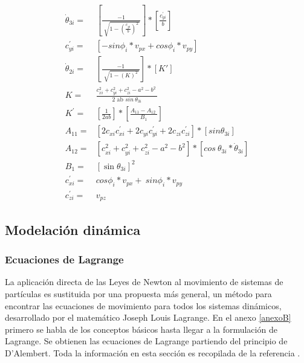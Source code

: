 \newpage

    \begin{align}
        \dot{ \theta }_{3i}={}& \left[ \frac{-1}{\sqrt[]{1- \left( \frac{c_{yi}}{b} \right) ^{2}~}} \right] \ast \left[ \frac{c_{yi}^{'}}{b} \right]
        \label{eq:cap4_eq_44}\\
        c_{yi}^{'}={}& \left[ -sin \phi _{i}\ast v_{px} + cos \phi _{i}\ast v_{py} \right]
        \label{eq:cap4_eq_45}\\
       \dot{ \theta }_{2i}={}& \left[ \frac{-1}{\sqrt[]{1- \left(  K \right) ^{2}~}} \right] \ast \left[ K' \right]
        \label{eq:cap4_eq_46}\\
        K={}& \frac{c_{xi}^{2}+c_{yi}^{2}+c_{zi}^{2}- a^{2}-b^{2}~}{\text{2 ab }sin~ \theta _{3i}}
        \label{eq:cap4_eq_47}\\
       K^{'}={}& \left[ \frac{1}{2ab} \right] \ast \left[ \frac{A_{11}-A_{12}~}{B_{1}} \right]
        \label{eq:cap4_eq_48}\\
        A_{11}={}& \left[ 2c_{xi}c_{xi}^{'}+2c_{yi}c_{yi}^{'}+2c_{zi}c_{zi}^{'} \right] \ast \left[ sin  \theta _{3i} \right]
        \label{eq:cap4_eq_49}\\
        A_{12}={}& \left[ c_{xi}^{2}+c_{yi}^{2}+c_{zi}^{2}- a^{2}-b^{2} \right] \ast \left[ cos~ \theta _{3i}\ast\dot{ \theta }_{3i} \right]
        \label{eq:cap4_eq_50}\\
        B_{1}={}& \left[ \sin  \theta _{3i} \right] ^{2}
        \label{eq:cap4_eq_51}\\
       c_{xi}^{'}={}& cos \phi _{i}\ast v_{px}+~ sin \phi _{i}\ast v_{py}
        \label{eq:cap4_eq_52}\\
       c_{zi}^{'}={}& v_{pz}
        \label{eq:cap4_eq_53}
    \end{align}


         \newpage






    \newpage

    
    \subsection{Modelación dinámica}
        \subsubsection{Ecuaciones de Lagrange}
            La aplicación directa de las Leyes de Newton al movimiento de sistemas de partículas es sustituida por una propuesta más general, un método para encontrar las ecuaciones de movimiento para todos los sistemas dinámicos, desarrollado por el matemático Joseph Louis Lagrange. En el anexo \ref{anexoB} primero se habla de los conceptos básicos hasta llegar a la formulación de Lagrange. Se obtienen las ecuaciones de Lagrange partiendo del principio de D’Alembert.  Toda la información en esta sección es recopilada de la referencia \cite{INTRO_MECANICA_LAGRAGE}.

